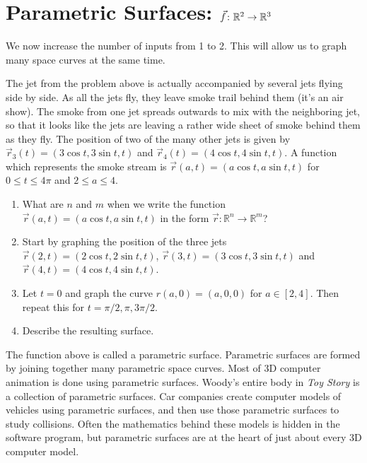 \section{Parametric Surfaces: $\vec f\colon  \mathbb{R}^2 \to \mathbb{R}^3$}
We now increase the number of inputs from 1 to 2.  This will allow us to graph many space curves at the same time.

\begin{problem} \label{parametric surface example}%
%
 The jet from the problem above is actually accompanied by several jets flying side by side. As all the jets fly, they leave smoke trail behind them (it's an air show). The smoke from one jet spreads outwards to mix with the neighboring jet, so that it looks like the jets are leaving a rather wide sheet of smoke behind them as they fly. The position of two of the many other jets is given by $\vec r_3(t)=(3\cos t, 3\sin t, t)$ and $\vec r_4(t)=(4\cos t,4\sin t,t)$.  A function which represents the smoke stream is $\vec r(a,t)=(a\cos t, a\sin t, t)$ for $0\leq t\leq 4\pi$ and $2\leq a\leq 4$.
 \begin{enumerate}
  \item What are $n$ and $m$ when we write the function $\vec r(a,t)=(a\cos t, a\sin t, t)$ in the form  $\vec r\colon {\mathbb{R}}^n\to {\mathbb{R}}^m$?
  \item Start by graphing the position of the three jets $\vec r(2,t)=(2\cos t, 2\sin t, t)$, $\vec r(3,t)=(3\cos t, 3\sin t, t)$ and $\vec r(4,t)=(4\cos t,4\sin t,t)$.  
  \item Let $t=0$ and graph the curve $r(a,0)=(a,0,0)$ for $a\in[2,4]$.  Then repeat this for $t=\pi/2,\pi,3\pi/2$.
  \item Describe the resulting surface.
 \end{enumerate}
\end{problem}

The function above is called a parametric surface.  Parametric surfaces are formed by joining together many parametric space curves. Most of 3D computer animation is done using parametric surfaces. Woody's entire body in {\it Toy Story} is a collection of parametric surfaces. Car companies create computer models of vehicles using parametric surfaces, and then use those parametric surfaces to study collisions. Often the mathematics behind these models is hidden in the software program, but parametric surfaces are at the heart of just about every 3D computer model.

